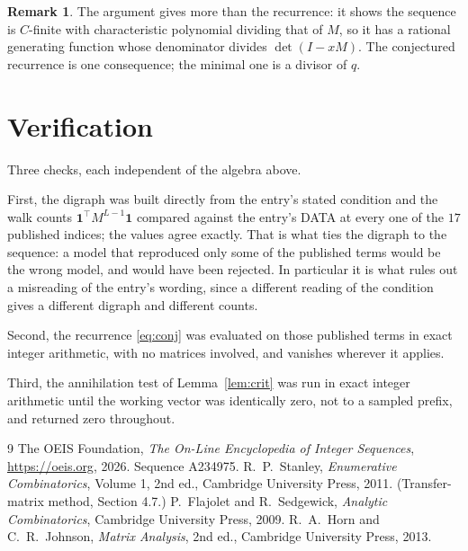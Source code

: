 \documentclass[11pt,a4paper]{article}
\theoremstyle{plain}
\theoremstyle{definition}
\newtheorem{remark}[theorem]{Remark}
\begin{document}
\begin{remark}
The argument gives more than the recurrence: it shows the sequence is $C$-finite with
characteristic polynomial dividing that of $M$, so it has a rational generating function
whose denominator divides $\det(I-xM)$. The conjectured recurrence is one consequence; the
minimal one is a divisor of $q$.
\end{remark}

\section{Verification}

Three checks, each independent of the algebra above.

First, the digraph was built directly from the entry's stated condition and the walk counts
$\mathbf{1}^{\!\top}M^{L-1}\mathbf{1}$ compared against the entry's DATA at
every one of the $17$ published indices; the values agree exactly. That is what ties
the digraph to the sequence: a model that reproduced only some of the published terms would
be the wrong model, and would have been rejected. In particular it is what rules out a
misreading of the entry's wording, since a different reading of the condition gives a
different digraph and different counts.

Second, the recurrence \eqref{eq:conj} was evaluated on those published terms in exact
integer arithmetic, with no matrices involved, and vanishes wherever it applies.

Third, the annihilation test of Lemma~\ref{lem:crit} was run in exact integer arithmetic
until the working vector was identically zero, not to a sampled prefix, and returned zero
throughout.

\begin{thebibliography}{9}
 The OEIS Foundation, \emph{The On-Line Encyclopedia of Integer
Sequences}, \url{https://oeis.org}, 2026. Sequence A234975.
 R.~P.~Stanley, \emph{Enumerative Combinatorics}, Volume 1, 2nd ed.,
Cambridge University Press, 2011. (Transfer-matrix method, Section 4.7.)
 P.~Flajolet and R.~Sedgewick, \emph{Analytic Combinatorics}, Cambridge
University Press, 2009.
 R.~A.~Horn and C.~R.~Johnson, \emph{Matrix Analysis}, 2nd ed., Cambridge
University Press, 2013.
\end{thebibliography}
\end{document}
